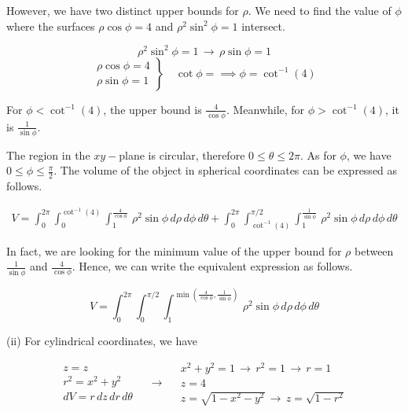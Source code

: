 \documentclass{article}
\begin{document}
\hfill

\noindent However, we have two distinct upper bounds for $\rho$. We need to find the value of $\phi$ where the surfaces $\rho\cos\phi = 4$ and $\rho^2\sin^2\phi=1$ intersect.

\begin{equation*}
\rho^2\sin^2\phi=1 \,\rightarrow\,\rho\sin\phi = 1
\end{equation*}
\[
\left.
\begin{array}{c}
\rho\cos\phi=4\\
\rho\sin\phi=1
\end{array}
\right\}\quad\cot\phi=\implies\phi=\cot^{-1}(4)
\]

\hfill

\noindent For $\displaystyle\phi<\cot^{-1}(4)$, the upper bound is $\displaystyle \frac4{\cos\phi}$. Meanwhile, for $\displaystyle\phi>\cot^{-1}(4)$, it is $\displaystyle \frac1{\sin\phi}$.

\hfill

\noindent The region in the $xy-$plane is circular, therefore $0\leq\theta\leq2\pi$. As for $\phi$, we have $\displaystyle0\leq\phi\leq\frac{\pi}2$. The volume of the object in spherical coordinates can be expressed as follows.

\begin{equation*}
\boxed{\begin{array}{cc}
V=\displaystyle\int_0^{2\pi}\int_0^{\cot^{-1}(4)}\int_1^{\textstyle\frac4{\cos\phi}}\,\rho^2\sin\phi\,d\rho\,d\phi\,d\theta
+\int_0^{2\pi}\int_{\cot^{-1}(4)}^{\pi/2}\int_1^{\textstyle\frac1{\sin\phi}}\,\rho^2\sin\phi\,d\rho\,d\phi\,d\theta 
\end{array}}
\end{equation*}

\hfill

\noindent In fact, we are looking for the minimum value of the upper bound for $\rho$ between $\displaystyle\frac1{\sin\phi}$ and $\displaystyle\frac4{\cos\phi}$. Hence, we can write the equivalent expression as follows.

\begin{equation*}
\boxed{V=\displaystyle\int_0^{2\pi}\int_0^{\pi/2}\int_1^{\min\left(\textstyle\frac4{\cos\phi},\frac1{\sin\phi}\right)}\,\rho^2\sin\phi\,d\rho\,d\phi\,d\theta}
\end{equation*}

\hfill

\noindent (ii) For cylindrical coordinates, we have

\[
\begin{array}{c}
z=z\\
r^2=x^2+y^2\\
dV=r\,dz\,dr\,d\theta
\end{array}\quad\rightarrow\quad
\begin{array}{c}
x^2+y^2=1\,\rightarrow\,r^2 = 1\,\rightarrow\,r=1\\
z=4\\
z=\sqrt{1-x^2-y^2}\,\rightarrow\,z=\sqrt{1-r^2}
\end{array}
\]
\end{document}
